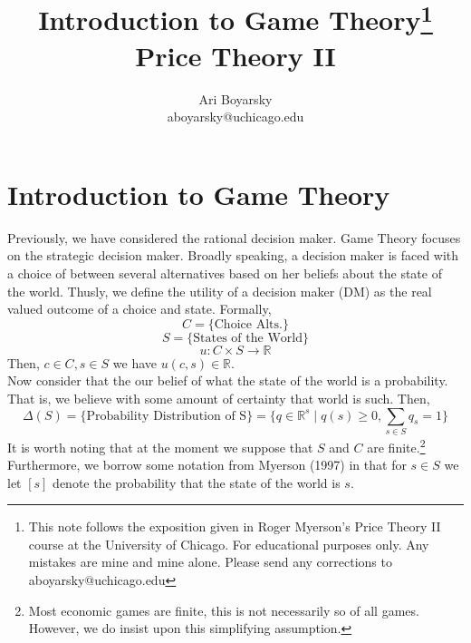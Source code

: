 \documentclass[dvips,11pt]{article}
\newcommand{\R}{\mathbb{R}}
\DeclareMathOperator{\?}{\,?\,}
\begin{document}

\title{Introduction to Game Theory\footnote{This note follows the exposition given in Roger Myerson's Price Theory II course at the University of Chicago. For educational purposes only. Any mistakes are mine and mine alone. Please send any corrections to aboyarsky@uchicago.edu} \\ Price Theory II}
\author{Ari Boyarsky \\ aboyarsky@uchicago.edu}

\maketitle

\section{Introduction to Game Theory}
Previously, we have considered the rational decision maker. Game Theory focuses on the strategic decision maker. Broadly speaking, a decision maker is faced with a choice of between several alternatives based on her beliefs about the state of the world. Thusly, we define the utility of a decision maker (DM) as the real valued outcome of a choice and state. Formally, 
$$C = \{\text{Choice Alts.}\}$$
$$S = \{\text{States of the World}\}$$
$$u: C \times S \rightarrow \R$$
Then, $c \in C, s \in S$ we have $u(c,s) \in \R$.
\\ Now consider that the our belief of what the state of the world is a probability. That is, we believe with some amount of certainty that world is such. Then,
$$\Delta(S)  = \{\text{Probability Distribution of S}\} = \{q \in \R^s \mid q(s) \geq 0, \sum_{s\in S} q_s = 1\}$$
It is worth noting that at the moment we suppose that $S$ and $C$ are finite.\footnote{Most economic games are finite, this is not necessarily so of all games. However, we do insist upon this simplifying assumption.} Furthermore, we borrow some notation from Myerson (1997) in that for $s \in S$ we let $[s]$ denote the probability that the state of the world is $s$.
\end{document}
